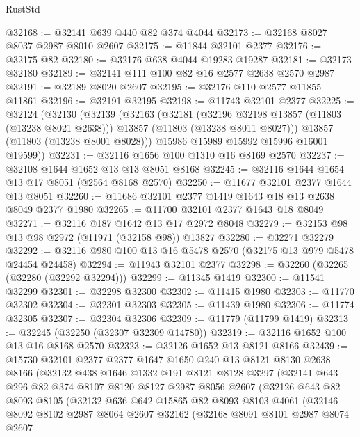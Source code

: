 \begin{lexlean}{RustStd}
\begin{coremodule}
@32168 := @32141 @639 @440 @82 @374 @4044
@32173 := @32168 @8027 @8037 @2987 @8010 @2607
@32175 := @11844 @32101 @2377
@32176 := @32175 @82
@32180 := @32176 @638 @4044 @19283 @19287
@32181 := @32173 @32180
@32189 := @32141 @111 @100 @82 @16 @2577 @2638 @2570 @2987
@32191 := @32189 @8020 @2607
@32195 := @32176 @110 @2577 @11855 @11861
@32196 := @32191 @32195
@32198 := @11743 @32101 @2377
@32225 := @32124
    (@32130
      (@32139
        (@32163
          (@32181
            (@32196 @32198 @13857 (@11803 (@13238 @8021 @2638)))
            @13857
            (@11803 (@13238 @8011 @8027)))
          @13857
          (@11803 (@13238 @8001 @8028)))
        @15986
        @15989
        @15992
        @15996
        @16001
        @19599))
@32231 := @32116 @1656 @100 @1310 @16 @8169 @2570
@32237 := @32108 @1644 @1652 @13 @13 @8051 @8168
@32245 := @32116 @1644 @1654 @13 @17 @8051 (@2564 @8168 @2570)
@32250 := @11677 @32101 @2377 @1644 @13 @8051
@32260 := @11686 @32101 @2377 @1419 @1643 @18 @13 @2638 @8049 @2377 @1980
@32265 := @11700 @32101 @2377 @1643 @18 @8049
@32271 := @32116 @187 @1642 @13 @17 @2972 @8048
@32279 := @32153 @98 @13 @98 @2972 (@11971 (@32158 @98)) @13827
@32280 := @32271 @32279
@32292 := @32116 @980 @100 @13 @16 @5478 @2570 (@32175 @13 @979 @5478 @24454 @24458)
@32294 := @11943 @32101 @2377
@32298 := @32260 (@32265 (@32280 (@32292 @32294)))
@32299 := @11345 @1419
@32300 := @11541 @32299
@32301 := @32298 @32300
@32302 := @11415 @1980
@32303 := @11770 @32302
@32304 := @32301 @32303
@32305 := @11439 @1980
@32306 := @11774 @32305
@32307 := @32304 @32306
@32309 := @11779 (@11799 @1419)
@32313 := @32245 (@32250 (@32307 @32309 @14780))
@32319 := @32116 @1652 @100 @13 @16 @8168 @2570
@32323 := @32126 @1652 @13 @8121 @8166
@32439 := @15730
    @32101
    @2377
    @2377
    @1647
    @1650
    @240
    @13
    @8121
    @8130
    @2638
    @8166
    (@32132
      @438
      @1646
      @1332
      @191
      @8121
      @8128
      @3297
      (@32141
        @643
        @296
        @82
        @374
        @8107
        @8120
        @8127
        @2987
        @8056
        @2607
        (@32126
          @643
          @82
          @8093
          @8105
          (@32132
            @636
            @642
            @15865
            @82
            @8093
            @8103
            @4061
            (@32146
              @8092
              @8102
              @2987
              @8064
              @2607
              @32162
              (@32168
                @8091
                @8101
                @2987
                @8074
                @2607

\end{coremodule}
\end{lexlean}
